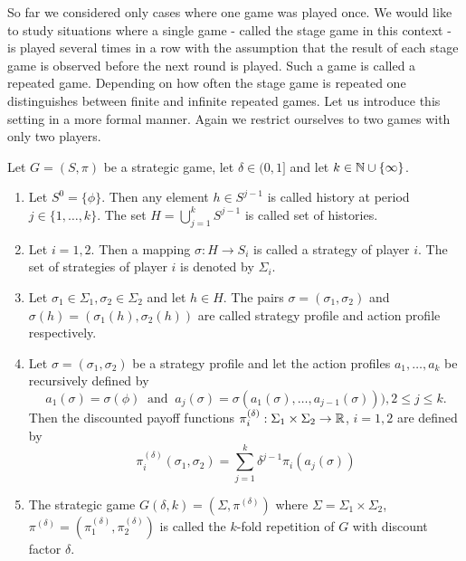 So far we considered only cases where one game was played once. We would like to study situations where a single game - called the stage game in this context - is
played several times in a row with the assumption that the result of each stage game is observed before the next round is played. Such a game is called
a repeated game. Depending on how often the stage game is repeated one distinguishes between finite and infinite repeated games. Let us introduce this setting
in a more formal manner. Again we restrict ourselves to two games with only two players.

\begin{definition}\label{def:repGame}
    Let $G = (S, \pi)$ be a strategic game, let $\delta \in(0, 1]$ and let $k\in\mathbb{N}\cup\{\infty\}$. 
    \begin{enumerate}
        \item Let $S^{0} = \{\phi\}$. Then any element $h\in S^{j - 1}$
            is called history at period $j\in\{1, \ldots, k\}$. The set $H = \bigcup_{j = 1}^{k}S^{j - 1}$ is called set of histories.
        \item Let $i = 1, 2$. Then a mapping $\sigma:H\to S_{i}$ is called a strategy of player $i$. The set of strategies of player $i$ is denoted by $\Sigma_{i}$.
        \item Let $\sigma_{1}\in\Sigma_{1}, \sigma_{2}\in\Sigma_{2}$ and let $h\in H$. The pairs $\sigma = (\sigma_{1}, \sigma_{2})$ and $\sigma(h) = (\sigma_{1}(h), \sigma_{2}(h))$
            are called strategy profile and action profile respectively.
        \item Let $\sigma = (\sigma_{1}, \sigma_{2})$ be a strategy profile and let the action profiles $a_{1}, \ldots, a_{k}$ be recursively defined by
            \begin{equation*}
                a_{1}(\sigma) = \sigma(\phi) ~\text{ and }~ a_{j}(\sigma) = \sigma(a_{1}(\sigma), \ldots, a_{j - 1}(\sigma))), 2\leq j\leq k.
            \end{equation*}
            Then the discounted payoff functions $\pi_{i}^{(\delta)}:\Sigma_{1}\times\Sigma_{2}\to\mathbb{R}$, $i = 1, 2$ are defined by
            \begin{equation*}
                \pi_{i}^{(\delta)}(\sigma_{1}, \sigma_{2}) = \sum_{j = 1}^{k}\delta^{j - 1}\pi_{i}(a_{j}(\sigma))
            \end{equation*}         
        \item The strategic game $G(\delta, k) = (\Sigma, \pi^{(\delta)})$ where $\Sigma = \Sigma_{1}\times\Sigma_{2}$, $\pi^{(\delta)} = (\pi_{1}^{(\delta)}, \pi_{2}^{(\delta)})$ is
            called the $k$-fold repetition of $G$ with discount factor $\delta.$
    \end{enumerate}
\end{definition}

